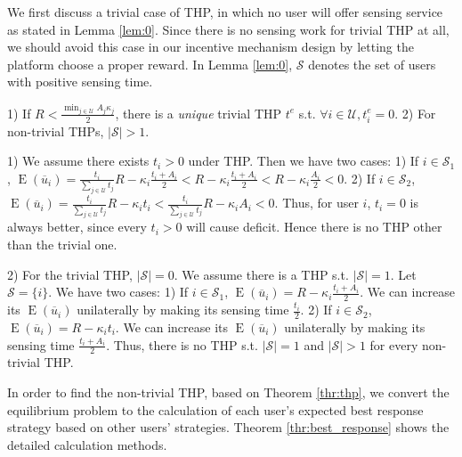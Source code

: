 \documentclass{IEEEtran}
\begin{document}
We first discuss a trivial case of THP, in which no user will offer sensing service as stated in Lemma \ref{lem:0}. Since there is no sensing work for trivial THP at all, we should avoid this case in our incentive mechanism design by letting the platform choose a proper reward. In Lemma \ref{lem:0}, $\mathcal{S}$ denotes the set of users with positive sensing time.

\begin{lemma}
\label{lem:0}
1) If $R<\frac{\min_{j\in\mathcal{U}}A_j\kappa_j}{2}$, there is a \emph{unique} trivial THP $t^{e}$ s.t. $\forall i\in \mathcal{U}, t_i^{e}=0$.
2) For non-trivial THPs, $|\mathcal{S}|>1$.
\end{lemma}
\begin{IEEEproof}
1) We assume there exists $t_i>0$ under THP. Then we have two cases: 1) If $i\in\mathcal{S}_1$, $\operatorname{E}(\overline{u}_i)=\frac{t_i}{\sum_{j\in\mathcal{U}}t_j}R-\kappa_i\frac{t_i+A_i}{2}<R-\kappa_i\frac{t_i+A_i}{2}<R-\kappa_i\frac{A_i}{2}<0$. 2) If $i\in\mathcal{S}_2$, $\operatorname{E}(\overline{u}_i)=\frac{t_i}{\sum_{j\in\mathcal{U}}t_j}R-\kappa_it_i<\frac{t_i}{\sum_{j\in\mathcal{U}}t_j}R-\kappa_iA_i<0$. Thus, for user $i$, $t_i=0$ is always better, since every $t_i>0$ will cause deficit. Hence there is no THP other than the trivial one.\par{}
2) For the trivial THP, $|\mathcal{S}|=0$. We assume there is a THP s.t. $|\mathcal{S}|=1$. Let $\mathcal{S}=\{i\}$. We have two cases: 1) If $i\in\mathcal{S}_1$, $\operatorname{E}(\overline{u}_i)=R-\kappa_i\frac{t_i+A_i}{2}$. We can increase its $\operatorname{E}(\overline{u}_i)$ unilaterally by making its sensing time $\frac{t_i}{2}$. 2) If $i \in\mathcal{S}_2$, $\operatorname{E}(\overline{u}_i)=R-\kappa_it_i$. We can increase its $\operatorname{E}(\overline{u}_i)$ unilaterally by making its sensing time $\frac{t_i+A_i}{2}$. Thus, there is no THP s.t. $|\mathcal{S}|=1$ and $|\mathcal{S}|>1$ for every non-trivial THP.
\end{IEEEproof}

In order to find the non-trivial THP, based on Theorem \ref{thr:thp}, we convert the equilibrium problem to the calculation of each user\rq{}s expected best response strategy based on other users' strategies. Theorem \ref{thr:best_response} shows the detailed calculation methods.
\end{document}
